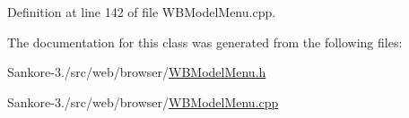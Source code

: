Definition at line 142 of file W\-B\-Model\-Menu.\-cpp.



The documentation for this class was generated from the following files\-:\begin{DoxyCompactItemize}
\item 
Sankore-\/3./src/web/browser/\hyperlink{_w_b_model_menu_8h}{W\-B\-Model\-Menu.\-h}\item 
Sankore-\/3./src/web/browser/\hyperlink{_w_b_model_menu_8cpp}{W\-B\-Model\-Menu.\-cpp}\end{DoxyCompactItemize}
